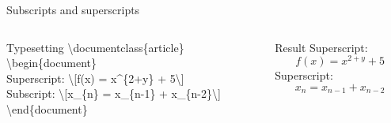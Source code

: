 \documentclass[10pt,xcolor={dvipsnames}]{beamer}
\begin{document}
	
		\begin{frame}{Subscripts and superscripts}
			\begin{columns}[T]
				\begin{column}{.6\textwidth}
					\begin{block}{Typesetting}
						\textbackslash documentclass\{{\color{blue}article}\}\\
						
						\textbackslash begin\{{\color{blue}document}\}\\
							
							\quad Superscript: \textbackslash[f(x) = x{\color{orange}\textasciicircum\{}2+y{\color{orange}\}} + 5\textbackslash]\\
							\quad Subscript: \textbackslash[x{\color{orange}\_\{}n{\color{orange}\}} = x{\color{orange}\_\{}n-1{\color{orange}\}} 
							+ x{\color{orange}\_\{}n-2{\color{orange}\}}\textbackslash]\\
							
						\textbackslash end\{{\color{blue}document}\}\\
					\end{block}
				\end{column}
			
				\onslide<3->
				\begin{column}{.4\textwidth}
					\begin{block}{Result}
						Superscript: \[f(x) = x^{2+y} + 5\]
						Superscript: \[x_{n} = x_{n-1} + x_{n-2}\]
					\end{block}					
				\end{column}
			\end{columns}
		\end{frame}
	
\end{document}
